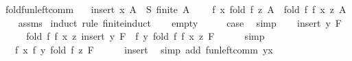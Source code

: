 \begin{isabellebody}
{}\isanewline
\isanewline
{}\isamarkupfalse%
\ fold{\isacharunderscore}{\kern0pt}fun{\isacharunderscore}{\kern0pt}left{\isacharunderscore}{\kern0pt}comm{\isacharcolon}{\kern0pt}\isanewline
\ \ \ {\isachardoublequoteopen}insert\ x\ A\ {\isasymsubseteq}\ S{\isachardoublequoteclose}\ {\isachardoublequoteopen}finite\ A{\isachardoublequoteclose}\ \isanewline
\ \ \ {\isachardoublequoteopen}f\ x\ {\isacharparenleft}{\kern0pt}fold\ f\ z\ A{\isacharparenright}{\kern0pt}\ {\isacharequal}{\kern0pt}\ fold\ f\ {\isacharparenleft}{\kern0pt}f\ x\ z{\isacharparenright}{\kern0pt}\ A{\isachardoublequoteclose}\isanewline
%
\isadelimproof
\ \ %
\endisadelimproof
%
\isatagproof
{}\isamarkupfalse%
\ assms{\isacharparenleft}{\kern0pt}{}{\isacharcomma}{\kern0pt}{}{\isacharparenright}{\kern0pt}\isanewline
{}\isamarkupfalse%
\ {\isacharparenleft}{\kern0pt}induct\ rule{\isacharcolon}{\kern0pt}\ finite{\isacharunderscore}{\kern0pt}induct{\isacharparenright}{\kern0pt}\isanewline
\ \ \isamarkupfalse%
\ empty\isanewline
\ \ \isamarkupfalse%
\ \isamarkupfalse%
\ {\isacharquery}{\kern0pt}case\ \isamarkupfalse%
\ simp\isanewline
{}\isamarkupfalse%
\isanewline
\ \ \isamarkupfalse%
\ {\isacharparenleft}{\kern0pt}insert\ y\ F{\isacharparenright}{\kern0pt}\isanewline
\ \ \isamarkupfalse%
\ \isamarkupfalse%
\ {\isachardoublequoteopen}fold\ f\ {\isacharparenleft}{\kern0pt}f\ x\ z{\isacharparenright}{\kern0pt}\ {\isacharparenleft}{\kern0pt}insert\ y\ F{\isacharparenright}{\kern0pt}\ {\isacharequal}{\kern0pt}\ f\ y\ {\isacharparenleft}{\kern0pt}fold\ f\ {\isacharparenleft}{\kern0pt}f\ x\ z{\isacharparenright}{\kern0pt}\ F{\isacharparenright}{\kern0pt}{\isachardoublequoteclose}\isanewline
\ \ \ \ \isamarkupfalse%
\ simp\isanewline
\ \ \isamarkupfalse%
\ \isamarkupfalse%
\ {\isachardoublequoteopen}{\isasymdots}\ {\isacharequal}{\kern0pt}\ f\ x\ {\isacharparenleft}{\kern0pt}f\ y\ {\isacharparenleft}{\kern0pt}fold\ f\ z\ F{\isacharparenright}{\kern0pt}{\isacharparenright}{\kern0pt}{\isachardoublequoteclose}\isanewline
\ \ \ \ \isamarkupfalse%
\ insert\ \isamarkupfalse%
\ {\isacharparenleft}{\kern0pt}simp\ add{\isacharcolon}{\kern0pt}\ fun{\isacharunderscore}{\kern0pt}left{\isacharunderscore}{\kern0pt}comm{\isacharbrackleft}{\kern0pt}\ {\isacharquery}{\kern0pt}y{\isacharequal}{\kern0pt}x{\isacharbrackright}{\kern0pt}{\isacharparenright}{\kern0pt}\isanewline

\end{isabellebody}
